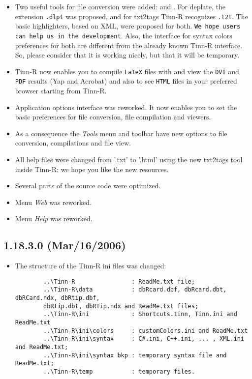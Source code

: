 \begin{itemize}
  \item Two useful tools for file conversion were added:
    and
    .
    For deplate, the extension \texttt{.dlpt} was proposed, and for txt2tags
    Tinn-R recognizes \texttt{.t2t}. The basic highlighters, based on XML,
    were proposed for both. \texttt{We hope users can help us in the
      development}. Also, the interface for syntax colors preferences for
    both are different from the already known Tinn-R interface. So, please
    consider that it is working nicely, but that it will be temporary.
  \item Tinn-R now enables you to compile \texttt{LaTeX} files with
     and view the
    \texttt{DVI} and \texttt{PDF} results (Yap and Acrobat) and also
    to see \texttt{HTML} files in your preferred browser starting from
    Tinn-R.
  \item Application options interface was reworked. It now enables you
    to set the basic preferences for file conversion, file compilation
    and viewers.
  \item As a consequence the \textit{Tools} menu and toolbar have new
    options to file conversion, compilations and file view.
  \item All help files were changed from '.txt' to '.html' using the
    new txt2tags tool inside Tinn-R: we hope you like the new resources.
  \item Several parts of the source code were optimized.
  \item Menu \textit{Web} was reworked.
  \item Menu \textit{Help} was reworked.
\end{itemize}


\subsection{1.18.3.0 (Mar/16/2006)}

\begin{itemize}
  \item The structure of the Tinn-R ini files was changed:

    \begin{footnotesize}
      \begin{verbatim}
        ..\Tinn-R                : ReadMe.txt file;
        ..\Tinn-R\data           : dbRcard.dbf, dbRcard.dbt, dbRCard.ndx, dbRtip.dbf,
        dbRtip.dbt, dbRTip.ndx and ReadMe.txt files;
        ..\Tinn-R\ini            : Shortcuts.tinn, Tinn.ini and ReadMe.txt
        ..\Tinn-R\ini\colors     : customColors.ini and ReadMe.txt
        ..\Tinn-R\ini\syntax     : C#.ini, C++.ini, ... , XML.ini and ReadMe.txt;
        ..\Tinn-R\ini\syntax bkp : temporary syntax file and ReadMe.txt;
        ..\Tinn-R\temp           : temporary files.
      \end{verbatim}
    \end{footnotesize}

\end{itemize}

